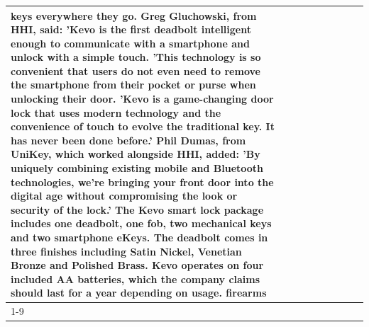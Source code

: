 \begin{table}[H]
\begin{tabular}{lllrlllll}
keys everywhere they go. Greg Gluchowski, from HHI, said: 'Kevo is the first deadbolt intelligent enough to communicate with a smartphone and unlock with a simple touch. 'This technology is so convenient that users do not even need to remove the smartphone from their pocket or purse when unlocking their door. 'Kevo is a game-changing door lock that uses modern technology and the convenience of touch to evolve the traditional key. It has never been done before.' Phil Dumas, from UniKey, which worked alongside HHI, added: 'By uniquely combining existing mobile and Bluetooth technologies, we’re bringing your front door into the digital age without compromising the look or security of the lock.' The Kevo smart lock package includes one deadbolt, one fob, two mechanical keys and two smartphone eKeys. The deadbolt comes in three finishes including Satin Nickel, Venetian Bronze and Polished Brass. Kevo operates on four included AA batteries, which the company claims should last for a year depending on usage. firearms \\
\cline{1-9}

\end{tabular}
\end{table}
